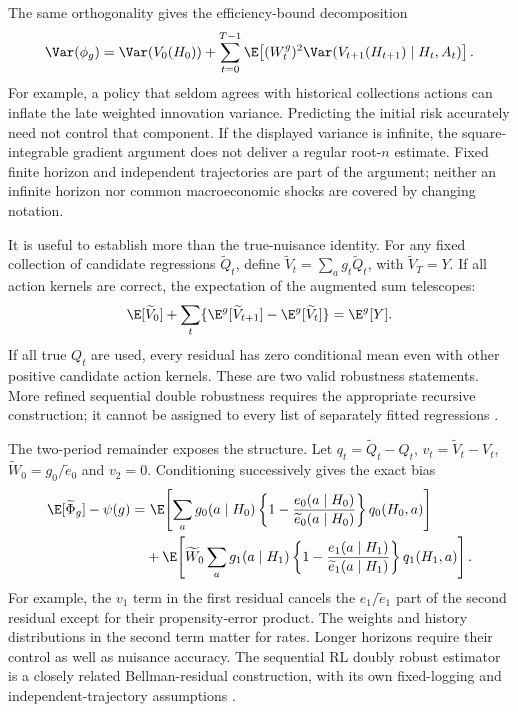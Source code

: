 The same orthogonality gives the efficiency-bound decomposition
\begin{equation}
 \Var(\phi_g)=\Var(V_0(H_0))+
 \sum_{t=0}^{T-1}\E\!\left[(W_t^g)^2
       \Var(V_{t+1}(H_{t+1})\mid H_t,A_t)\right].
 \label{r3:long-variance}
\end{equation}
For example, a policy that seldom agrees with historical collections
actions can inflate the late weighted innovation variance. Predicting
the initial risk accurately need not control that component. If the
displayed variance is infinite, the square-integrable gradient argument
does not deliver a regular root-$n$ estimate. Fixed finite horizon and
independent trajectories are part of the argument; neither an infinite
horizon nor common macroeconomic shocks are covered by changing notation.

It is useful to establish more than the true-nuisance identity. For any
fixed collection of candidate regressions $\widetilde Q_t$, define
$\widetilde V_t=\sum_a g_t\widetilde Q_t$, with
$\widetilde V_T=Y$. If all action kernels are correct, the expectation
of the augmented sum telescopes:
\[
 \E[\widetilde V_0]+\sum_t
  \{\E^g[\widetilde V_{t+1}]-\E^g[\widetilde V_t]\}
 =\E^g[Y].
\]
If all true $Q_t$ are used, every residual has zero conditional mean
even with other positive candidate action kernels. These are two valid
robustness statements. More refined sequential double robustness
requires the appropriate recursive construction; it cannot be assigned
to every list of separately fitted regressions
\citep{sequentialdr2018}.

The two-period remainder exposes the structure. Let
$q_t=\widetilde Q_t-Q_t$, $v_t=\widetilde V_t-V_t$,
$\widetilde W_0=g_0/\widetilde e_0$ and $v_2=0$.
Conditioning successively gives the exact bias
\begin{align}
 \E[\widetilde\Phi_g]-\psi(g)
 =&\ \E\!\left[\sum_a g_0(a\mid H_0)
        \left\{1-\frac{e_0(a\mid H_0)}{\widetilde e_0(a\mid H_0)}\right\}
                              q_0(H_0,a)\right]\nonumber\\
 &+\E\!\left[\widetilde W_0\sum_a g_1(a\mid H_1)
       \left\{1-\frac{e_1(a\mid H_1)}{\widetilde e_1(a\mid H_1)}\right\}
                              q_1(H_1,a)\right].
 \label{r3:two-period-remainder}
\end{align}
For example, the $v_1$ term in the first residual cancels the
$e_1/\widetilde e_1$ part of the second residual except for their
propensity-error product. The weights and history distributions in the
second term matter for rates. Longer horizons require their control as
well as nuisance accuracy. The sequential RL doubly robust estimator
is a closely related Bellman-residual construction, with its own
fixed-logging and independent-trajectory assumptions
\citep[Section 4.1]{jiang2016}.

